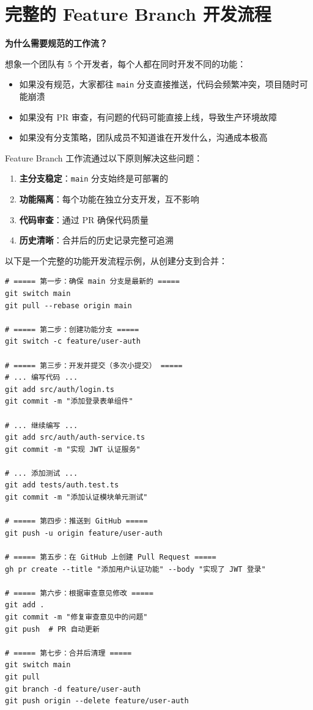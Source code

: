 \documentclass[12pt,a4paper,openany]{ctexbook}
\begin{document}
\section{完整的 Feature Branch 开发流程}

\medskip
\textbf{为什么需要规范的工作流？}

想象一个团队有 5 个开发者，每个人都在同时开发不同的功能：
\begin{itemize}
  \item 如果没有规范，大家都往 \texttt{main} 分支直接推送，代码会频繁冲突，项目随时可能崩溃
  \item 如果没有 PR 审查，有问题的代码可能直接上线，导致生产环境故障
  \item 如果没有分支策略，团队成员不知道谁在开发什么，沟通成本极高
\end{itemize}

Feature Branch 工作流通过以下原则解决这些问题：
\begin{enumerate}
  \item \textbf{主分支稳定}：\texttt{main} 分支始终是可部署的
  \item \textbf{功能隔离}：每个功能在独立分支开发，互不影响
  \item \textbf{代码审查}：通过 PR 确保代码质量
  \item \textbf{历史清晰}：合并后的历史记录完整可追溯
\end{enumerate}
\medskip

以下是一个完整的功能开发流程示例，从创建分支到合并：

\begin{lstlisting}[style=shell]
# ===== 第一步：确保 main 分支是最新的 =====
git switch main
git pull --rebase origin main

# ===== 第二步：创建功能分支 =====
git switch -c feature/user-auth

# ===== 第三步：开发并提交（多次小提交） =====
# ... 编写代码 ...
git add src/auth/login.ts
git commit -m "添加登录表单组件"

# ... 继续编写 ...
git add src/auth/auth-service.ts
git commit -m "实现 JWT 认证服务"

# ... 添加测试 ...
git add tests/auth.test.ts
git commit -m "添加认证模块单元测试"

# ===== 第四步：推送到 GitHub =====
git push -u origin feature/user-auth

# ===== 第五步：在 GitHub 上创建 Pull Request =====
gh pr create --title "添加用户认证功能" --body "实现了 JWT 登录"

# ===== 第六步：根据审查意见修改 =====
git add .
git commit -m "修复审查意见中的问题"
git push  # PR 自动更新

# ===== 第七步：合并后清理 =====
git switch main
git pull
git branch -d feature/user-auth
git push origin --delete feature/user-auth
\end{lstlisting}
\end{document}
